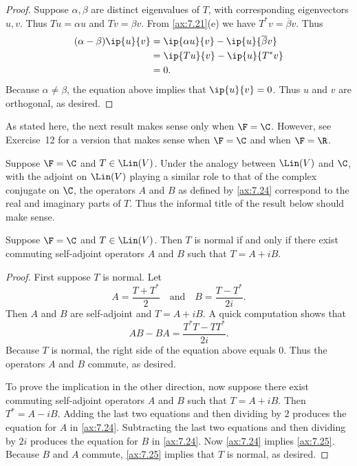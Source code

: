 \begin{proof}
Suppose $\alpha,\beta$ are distinct eigenvalues of $T$, with corresponding
eigenvectors $u,v$. Thus $Tu=\alpha u$ and $Tv=\beta v$. From \ref{ax:7.21}(e)
we have $T^*v=\overline{\beta}v$. Thus
\begin{align*}
(\alpha-\beta)\ip{u}{v} &= \ip{\alpha u}{v}-\ip{u}{\overline{\beta}v}\\
                        &= \ip{Tu}{v}-\ip{u}{T^*v}\\
                        &= 0.
\end{align*}
Because $\alpha\ne\beta$, the equation above implies that $\ip{u}{v}=0$. Thus
$u$ and $v$ are orthogonal, as desired.
\end{proof}

As stated here, the next result makes sense only when $\F=\C$. However, see
Exercise~12 for a version that makes sense when $\F=\C$ and when $\F=\R$.

Suppose $\F=\C$ and $T\in\Lin(V)$. Under the analogy between $\Lin(V)$ and
$\C$, with the adjoint on $\Lin(V)$ playing a similar role to that of the
complex conjugate on $\C$, the operators $A$ and $B$ as defined by \ref{ax:7.24}
correspond to the real and imaginary parts of $T$. Thus the informal title of
the result below should make sense.

\begin{result}\label{ax:7.23}
Suppose $\F=\C$ and $T\in\Lin(V)$. Then $T$ is normal if and only if there
exist commuting self-adjoint operators $A$ and $B$ such that $T=A+iB$.
\end{result}

\begin{proof}
First suppose $T$ is normal. Let
\[ A = \frac{T+T^*}{2} \quad\text{and}\quad B = \frac{T-T^*}{2i}.
   \tag{\thetheorem} \]
Then $A$ and $B$ are self-adjoint and $T=A+iB$. A quick computation shows
that
\[ AB-BA = \frac{T^*T-TT^*}{2i}. \tag{\thetheorem} \]
Because $T$ is normal, the right side of the equation above equals $0$. Thus
the operators $A$ and $B$ commute, as desired.

To prove the implication in the other direction, now suppose there exist
commuting self-adjoint operators $A$ and $B$ such that $T=A+iB$. Then
$T^*=A-iB$. Adding the last two equations and then dividing by $2$ produces the
equation for $A$ in \ref{ax:7.24}. Subtracting the last two equations and then
dividing by $2i$ produces the equation for $B$ in \ref{ax:7.24}. Now
\ref{ax:7.24} implies \ref{ax:7.25}. Because $B$ and $A$ commute,
\ref{ax:7.25} implies that $T$ is normal, as desired.
\end{proof}

